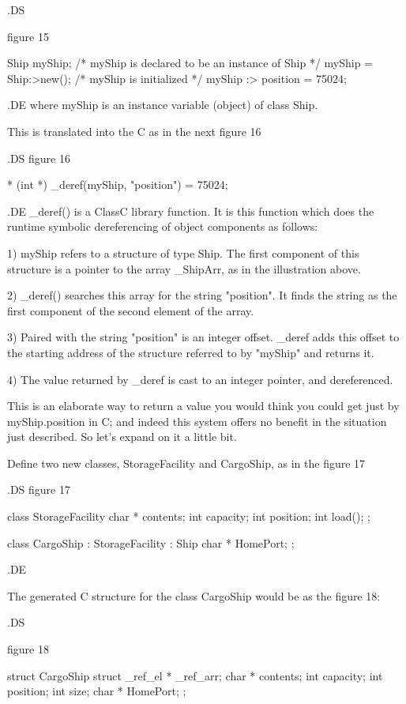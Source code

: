 .DS

figure 15

Ship	myShip;		/* myShip is declared to be an instance of Ship */ 
myShip = Ship:>new();	/* myShip is initialized */
myShip :> position = 75024;


.DE
where myShip is an instance variable (object) of class Ship.

This is translated into the C as in the next figure 16

.DS
figure 16

* (int *) _deref(myShip, "position") = 75024;

.DE
_deref() is a ClassC library function.  It is this function which does the
runtime symbolic dereferencing of object components as follows:

1)	myShip refers to a structure of type Ship.  The first
	component of this structure is a pointer to the array
	_ShipArr, as in the illustration above.  

2)	_deref() searches this array for the string "position".  
	It finds the string as the first component of the second
	element of the array.

3)	Paired with the string "position" is an integer offset.  
	_deref adds this offset to the starting address of the
	structure referred to by "myShip" and returns it.

4)	The value returned by _deref is cast to an integer pointer,
	and dereferenced.

This is an elaborate way to return a value you would think you could
get just by myShip.position in C; and indeed this system offers no
benefit in the situation just described.  So let's expand on it a little
bit.

Define two new classes, StorageFacility and CargoShip, as in the figure 17

.DS
figure 17

class StorageFacility
    {
	char *	contents;
	int	capacity;
	int	position;
	int	load();
    }	;

class CargoShip : StorageFacility : Ship
    {
	char *	HomePort;
    }	;

.DE

The generated C structure for the class CargoShip would be as the figure 18:

.DS

figure 18

struct CargoShip
    {
	struct _ref_el * _ref_arr;
	char *	contents;
	int	capacity;
	int	position;
	int	size;
	char *	HomePort;
    }	;


